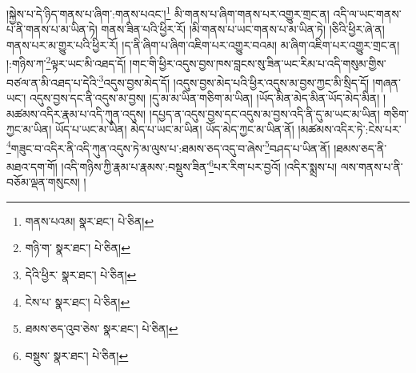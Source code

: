 །སྐྱེས་པ་དེ་ཉིད་གནས་པ་ཞིག་:གནས་པའང་།\footnote{གནས་པའམ།  སྣར་ཐང་།  པེ་ཅིན། } མི་གནས་པ་ཞིག་གནས་པར་འགྱུར་གྲང་ན། འདི་ལ་ཡང་གནས་པ་ནི་གནས་པ་མ་ཡིན་ཏེ། གནས་ཟིན་པའི་ཕྱིར་རོ། །མི་གནས་པ་ཡང་གནས་པ་མ་ཡིན་ཏེ། །ཅིའི་ཕྱིར་ཞེ་ན། གནས་པར་མ་གྱུར་པའི་ཕྱིར་རོ། །ད་ནི་ཞིག་པ་ཞིག་འཇིག་པར་འགྱུར་བའམ། མ་ཞིག་འཇིག་པར་འགྱུར་གྲང་ན། །:གཉིས་ཀ་\footnote{གཉི་ག་  སྣར་ཐང་།  པེ་ཅིན། }ལྟར་ཡང་མི་འཐད་དོ། །གང་གི་ཕྱིར་འདུས་བྱས་ཁས་བླངས་སུ་ཟིན་ཡང་རིམ་པ་འདི་གསུམ་གྱིས་བཙལ་ན་མི་འཐད་པ་དེའི་\footnote{དེའི་ཕྱིར་  སྣར་ཐང་།  པེ་ཅིན། }འདུས་བྱས་མེད་དོ། །འདུས་བྱས་མེད་པའི་ཕྱིར་འདུས་མ་བྱས་ཀྱང་མི་སྲིད་དོ། །གཞན་ཡང་། འདུས་བྱས་དང་ནི་འདུས་མ་བྱས། །དུ་མ་མ་ཡིན་གཅིག་མ་ཡིན། །ཡོད་མིན་མེད་མིན་ཡོད་མེད་མིན། །མཚམས་འདིར་རྣམ་པ་འདི་ཀུན་འདུས། །དཔྱད་ན་འདུས་བྱས་དང་འདུས་མ་བྱས་འདི་ནི་དུ་མ་ཡང་མ་ཡིན། གཅིག་ཀྱང་མ་ཡིན། ཡོད་པ་ཡང་མ་ཡིན། མེད་པ་ཡང་མ་ཡིན། ཡོད་མེད་ཀྱང་མ་ཡིན་ནོ། །མཚམས་འདིར་ཏེ་:ངེས་པར་\footnote{ངེས་པ་  སྣར་ཐང་།  པེ་ཅིན། }གཟུང་བ་འདིར་ནི་འདི་ཀུན་འདུས་ཏེ་མ་ལུས་པ་:ཐམས་ཅད་འདུ་བ་ཞེས་\footnote{ཐམས་ཅད་འུབ་ཅེས་  སྣར་ཐང་།  པེ་ཅིན། }བཤད་པ་ཡིན་ནོ། །ཐམས་ཅད་ནི་མཐའ་དག་གོ། །འདི་གཉིས་ཀྱི་རྣམ་པ་རྣམས་:བསྡུས་ཟིན་\footnote{བསྡུས་  སྣར་ཐང་།  པེ་ཅིན། }པར་རིག་པར་བྱའོ། །འདིར་སྨྲས་པ། ལས་གནས་པ་ནི་བཅོམ་ལྡན་གསུངས། །
